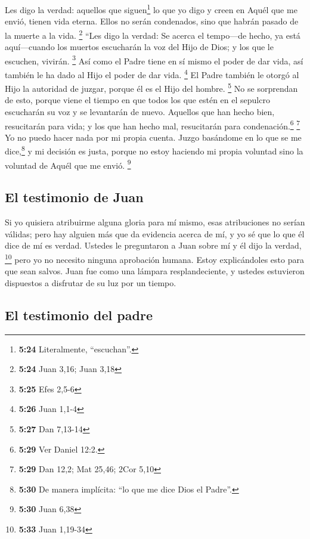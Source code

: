  Les digo la verdad: aquellos que siguen\footnote{\textbf{5:24}
  Literalmente, ``escuchan''.} lo que yo digo y creen en Aquél que me
envió, tienen vida eterna. Ellos no serán condenados, sino que habrán
pasado de la muerte a la vida. \footnote{\textbf{5:24} Juan 3,16; Juan
  3,18}  ``Les digo la verdad: Se acerca el tempo---de
hecho, ya está aquí---cuando los muertos escucharán la voz del Hijo de
Dios; y los que le escuchen, vivirán. \footnote{\textbf{5:25} Efes 2,5-6}
 Así como el Padre tiene en sí mismo el poder de dar
vida, así también le ha dado al Hijo el poder de dar vida. \footnote{\textbf{5:26}
  Juan 1,1-4}  El Padre también le otorgó al Hijo la
autoridad de juzgar, porque él es el Hijo del hombre. \footnote{\textbf{5:27}
  Dan 7,13-14}  No se sorprendan de esto, porque viene el
tiempo en que todos los que estén en el sepulcro escucharán su voz
 y se levantarán de nuevo. Aquellos que han hecho bien,
resucitarán para vida; y los que han hecho mal, resucitarán para
condenación.\footnote{\textbf{5:29} Ver Daniel 12:2.} \footnote{\textbf{5:29}
  Dan 12,2; Mat 25,46; 2Cor 5,10}  Yo no puedo hacer nada
por mi propia cuenta. Juzgo basándome en lo que se me dice,\footnote{\textbf{5:30}
  De manera implícita: ``lo que me dice Dios el Padre''.} y mi decisión
es justa, porque no estoy haciendo mi propia voluntad sino la voluntad
de Aquél que me envió. \footnote{\textbf{5:30} Juan 6,38}

\hypertarget{el-testimonio-de-juan}{%
\subsection{El testimonio de Juan}\label{el-testimonio-de-juan}}

 Si yo quisiera atribuirme alguna gloria para mí mismo,
esas atribuciones no serían válidas;  pero hay alguien
más que da evidencia acerca de mí, y yo sé que lo que él dice de mí es
verdad.  Ustedes le preguntaron a Juan sobre mí y él dijo
la verdad, \footnote{\textbf{5:33} Juan 1,19-34}  pero yo
no necesito ninguna aprobación humana. Estoy explicándoles esto para que
sean salvos.  Juan fue como una lámpara resplandeciente,
y ustedes estuvieron dispuestos a disfrutar de su luz por un tiempo.

\hypertarget{el-testimonio-del-padre}{%
\subsection{El testimonio del padre}\label{el-testimonio-del-padre}}

